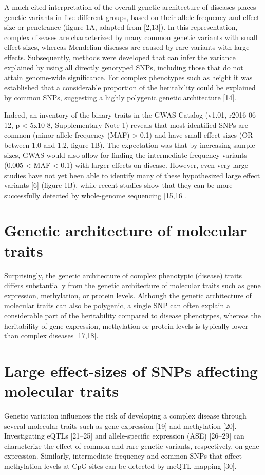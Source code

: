 A much cited interpretation of the overall genetic architecture of diseases places genetic variants in five different groups, based on their allele frequency and effect size or penetrance (figure 1A, adapted from [2,13]). In this representation, complex diseases are characterized by many common genetic variants with small effect sizes, whereas Mendelian diseases are caused by rare variants with large effects. Subsequently, methods were developed that can infer the variance explained by using all directly genotyped SNPs, including those that do not attain genome-wide significance. For complex phenotypes such as height it was established that a considerable proportion of the heritability could be explained by common SNPs, suggesting a highly polygenic genetic architecture [14].

Indeed, an inventory of the binary traits in the GWAS Catalog (v1.01, r2016-06-12, p < 5x10-8, Supplementary Note 1) reveals that most identified SNPs are common (minor allele frequency (MAF) > 0.1) and have small effect sizes (OR between 1.0 and 1.2, figure 1B). The expectation was that by increasing sample sizes, GWAS would also allow for finding the intermediate frequency variants (0.005 < MAF < 0.1) with larger effects on disease. However, even very large studies have not yet been able to identify many of these hypothesized large effect variants [6] (figure 1B), while recent studies show that they can be more successfully detected by whole-genome sequencing [15,16].

\section{Genetic architecture of molecular traits}
Surprisingly, the genetic architecture of complex phenotypic (disease) traits differs substantially from the genetic architecture of molecular traits such as gene expression, methylation, or protein levels. Although the genetic architecture of molecular traits can also be polygenic, a single SNP can often explain a considerable part of the heritability compared to disease phenotypes, whereas the heritability of gene expression, methylation or protein levels is typically lower than complex diseases [17,18]. 

\section{Large effect-sizes of SNPs affecting molecular traits}
Genetic variation influences the risk of developing a complex disease through several molecular traits such as gene expression [19] and methylation [20]. Investigating eQTLs [21–25] and allele-specific expression (ASE) [26–29] can characterize the effect of common and rare genetic variants, respectively, on gene expression. Similarly, intermediate frequency and common SNPs that affect methylation levels at CpG sites can be detected by meQTL mapping [30].

